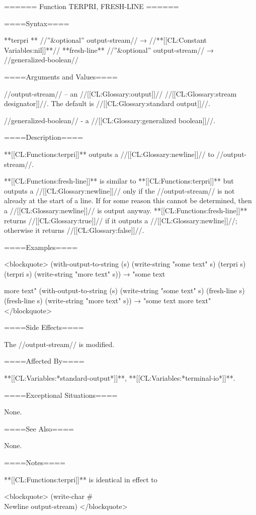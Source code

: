 ====== Function TERPRI, FRESH-LINE ======

====Syntax====

**{terpri} ** //''&optional'' output-stream// → //**[[CL:Constant Variables:nil]]**// **{fresh-line}** //''&optional'' output-stream// → //generalized-boolean//

====Arguments and Values====

//output-stream// -- an //[[CL:Glossary:output]]// //[[CL:Glossary:stream designator]]//. The default is //[[CL:Glossary:standard output]]//.

//generalized-boolean// - a //[[CL:Glossary:generalized boolean]]//.

====Description====

**[[CL:Functions:terpri]]** outputs a //[[CL:Glossary:newline]]// to //output-stream//.

**[[CL:Functions:fresh-line]]** is similar to **[[CL:Functions:terpri]]** but outputs a //[[CL:Glossary:newline]]// only if the //output-stream// is not already at the start of a line. If for some reason this cannot be determined, then a //[[CL:Glossary:newline]]// is output anyway. **[[CL:Functions:fresh-line]]** returns //[[CL:Glossary:true]]// if it outputs a //[[CL:Glossary:newline]]//; otherwise it returns //[[CL:Glossary:false]]//.

====Examples====

<blockquote> (with-output-to-string (s) (write-string "some text" s) (terpri s) (terpri s) (write-string "more text" s)) → "some text

more text" (with-output-to-string (s) (write-string "some text" s) (fresh-line s) (fresh-line s) (write-string "more text" s)) → "some text more text" </blockquote>

====Side Effects====

The //output-stream// is modified.

====Affected By====

**[[CL:Variables:*standard-output*]]**, **[[CL:Variables:*terminal-io*]]**.

====Exceptional Situations====

None. 

====See Also====

None.

====Notes====

**[[CL:Functions:terpri]]** is identical in effect to

<blockquote> (write-char #\\Newline output-stream) </blockquote>

